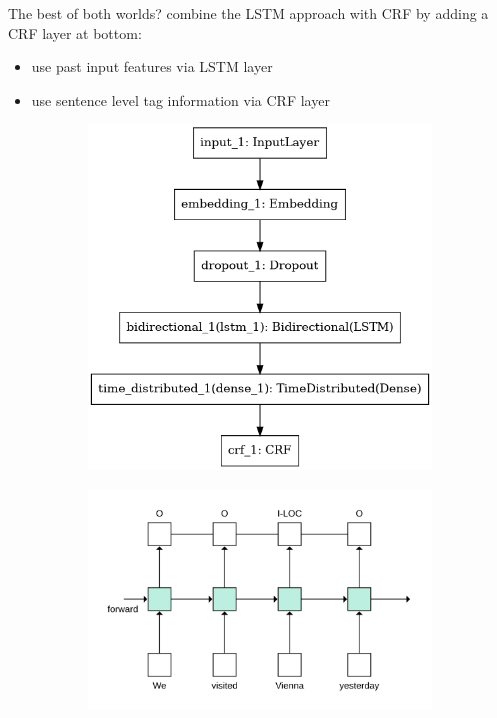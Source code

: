 \documentclass[12pt, tikz]{beamer}
\begin{document}
\begin{frame}[fragile]{The best of both worlds?}
	combine the LSTM approach with CRF by adding a CRF layer at bottom:
	\begin{itemize}
		\item use past input features via LSTM layer
		\item use sentence level tag information via CRF layer
	\end{itemize}
	\pause
	\vspace{-0.2cm}
	
	\centering
	\begin{figure}
		\centering
		\begin{subfigure}{.5\textwidth}
			\centering
			\includegraphics[width=\linewidth]{img/lstm_crf_model.png}
		\end{subfigure}%
		\begin{subfigure}{.5\textwidth}
			\centering
			\includegraphics[width=\linewidth]{img/lstm_crf_overview.png}
		\end{subfigure}
		
	\end{figure}

	
\end{frame}
\end{document}
